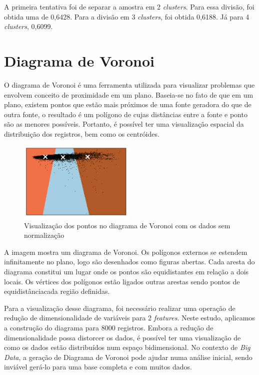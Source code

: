 \begin{anexosenv}
A primeira tentativa foi de separar a amostra em 2 \emph{clusters}. Para essa divisão, foi obtida uma de 0,6428. Para a divisão em 3 \emph{clusters}, foi obtida 0,6188. Já para 4 \emph{clusters}, 0,6099.


\chapter{Diagrama de Voronoi}

O diagrama de Voronoi é uma ferramenta utilizada para visualizar problemas que envolvem conceito de proximidade em um plano. Baseia-se no fato de que em um plano, existem pontos que estão mais próximos de uma fonte geradora do que de outra fonte, o resultado é um polígono de cujas distâncias entre a fonte e ponto são as menores possíveis. Portanto, é possível ter uma visualização espacial da distribuição dos registros, bem como os centróides.

\begin{figure}[!ht]
\caption{Visualização dos pontos no diagrama de Voronoi com os dados sem normaliza\c c\~ao}
\centerline{\includegraphics[width=0.5\textwidth]{img/voronoi}}
\end{figure}

A imagem mostra um diagrama de Voronoi. Os polígonos externos se estendem infinitamente no plano, logo são desenhados como figuras abertas. Cada aresta do diagrama constitui um lugar onde os pontos são equidistantes em relação a dois locais. Os vértices dos polígonos estão ligados outras arestas sendo pontos de equidistânciacada região definidas.

Para a visualização desse diagrama, foi necessário realizar uma operação de redução de dimensionalidade de variáveis para 2 \emph{features}. Neste estudo, aplicamos a construção do diagrama para 8000 registros. Embora a redução de dimensionalidade possa distorcer os dados, é possível ter uma visualização de como os dados estão distribuídos num espaço bidimensional. No contexto de \emph{Big Data}, a geração de Diagrama de Voronoi pode ajudar numa análise inicial, sendo inviável gerá-lo para uma base completa e com muitos dados.


\end{anexosenv}
